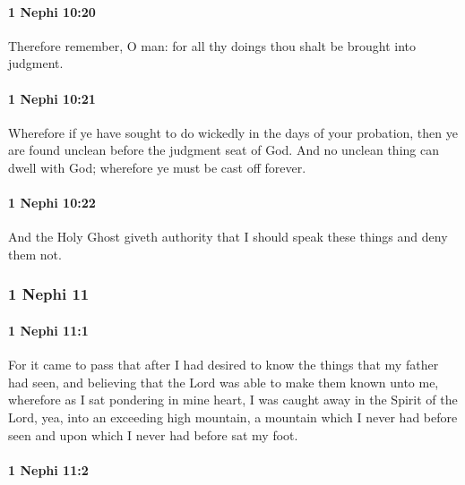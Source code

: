 		\paragraph{1 Nephi 10:20} %
			\label{1NEPHI-10-20}

			Therefore remember, O man:
			for all thy doings thou shalt be brought into judgment.

		\paragraph{1 Nephi 10:21} %
			\label{1NEPHI-10-21}

			Wherefore if ye have sought to do wickedly in the days of your probation,
			then ye are found unclean before the judgment seat of God.
			And no unclean thing can dwell with God;
			wherefore ye must be cast off forever.

		\paragraph{1 Nephi 10:22} %
			\label{1NEPHI-10-22}

			And the Holy Ghost giveth authority
			that I should speak these things and deny them not.

	\subsubsection{1 Nephi 11} %
		\label{1NEPHI-11}
		
		\paragraph{1 Nephi 11:1} %
			\label{1NEPHI-11-1}

			For it came to pass that after I had desired
			to know the things that my father had seen,
			and believing that the Lord was able to make them known unto me,
			wherefore as I sat pondering in mine heart,
			I was caught away in the Spirit of the Lord,
			yea, into an exceeding high mountain,
			a mountain which I never had before seen
			and upon which I never had before sat my foot.

		\paragraph{1 Nephi 11:2} %
			\label{1NEPHI-11-2}

